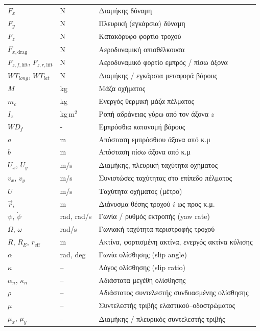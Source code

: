{\begin{longtable}{@{}p{3cm} p{2.3cm} p{9cm}@{}}
$F_x$              & N        & Διαμήκης δύναμη\\
$F_y$              & N        & Πλευρική (εγκάρσια) δύναμη\\
$F_z$              & N        & Κατακόρυφο φορτίο τροχού \\
$F_{x,\text{drag}}$ & N       & Αεροδυναμική οπισθέλκουσα \\
$F_{z,f,\text{lift}}$, $F_{z,r,\text{lift}}$ & N & Αεροδυναμικό φορτίο εμπρός / πίσω άξονα \\
$WT_{long}$, $WT_{lat}$ & N & Διαμήκης / εγκάρσια μεταφορά βάρους \\
$M$                & kg       & Μάζα οχήματος \\
$m_c$              & kg       & Ενεργός θερμική μάζα πέλματος \\
$I_z$              & kg\,m$^2$ & Ροπή αδράνειας γύρω από τον άξονα $z$ \\
$WD_f$              & - & Εμπρόσθια κατανομή βάρους \\
$a$              & m & Απόσταση εμπρόσθιου άξονα από κ.μ \\
$b$              & m & Απόσταση πίσω άξονα από κ.μ \\
$U_x$, $U_y$       & m/s      & Διαμήκης, πλευρική ταχύτητα οχήματος \\
$v_x$, $v_y$       & m/s      & Συνιστώσες ταχύτητας στο επίπεδο πέλματος \\
$U$                & m/s      & Ταχύτητα οχήματος (μέτρο) \\
$\vec{r}_i$        & m        & Διάνυσμα θέσης τροχού $i$ ως προς κ.μ. \\
$\psi$, $\dot{\psi}$ & rad, rad/s & Γωνία / ρυθμός εκτροπής (yaw rate) \\
$\Omega$, $\omega$ & rad/s    & Γωνιακή ταχύτητα περιστροφής τροχού \\
$R$, $R_E$, $r_{\text{eff}}$ & m & Ακτίνα, φορτισμένη ακτίνα, ενεργός ακτίνα κύλισης \\
$\alpha$           & rad, deg & Γωνία ολίσθησης (slip angle) \\
$\kappa$           & --       & Λόγος ολίσθησης (slip ratio) \\
$\alpha_n$, $\kappa_n$ & --   & Αδιάστατα μεγέθη ολίσθησης \\
$\rho$             & --       & Αδιάστατος συντελεστής συνδυασμένης ολίσθησης \\
$\mu$              & --       & Συντελεστής τριβής ελαστικού--οδοστρώματος \\
$\mu_x$, $\mu_y$   & --       & Διαμήκης / πλευρικός συντελεστής τριβής \\

\end{longtable}}
